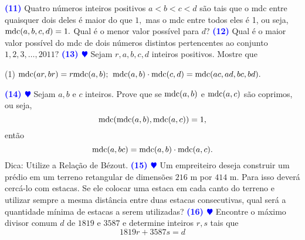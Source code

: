 \documentclass[12pt, a4paper]{article}
\newcommand{\mdc}{{\rm mdc}}
\newcommand{\negrito}[1]{\mbox{\boldmath{$#1$}}}
\begin{document}
\textcolor{blue}{\bf(11)} Quatro números inteiros positivos $a < b < c < d$ são tais que o mdc entre quaisquer
dois deles é maior do que $1,$ mas o mdc entre todos eles é 1, ou seja, $\mdc(a,b,c,d) = 1.$  Qual é o menor valor possível para $d$?
\newline\newline
\textcolor{blue}{\bf(12)} Qual é o maior valor possível do mdc de dois números distintos pertencentes ao conjunto
$1,2,3, \ldots ,2011?$
\newline \newline
\textcolor{blue}{\bf(13) $\varheart$} Sejam $r, a, b, c, d$ inteiros positivos. Mostre que
\begin{tasks}[counter-format={(tsk[a])},label-width=3.6ex, label-format = {\bfseries}, column-sep = {0pt}](1)
\task[\textcolor{Floresta}{$\negrito{(a)} $}] $\mdc(ar, br) = r \mdc(a,b);$
\task[\textcolor{Floresta}{$\negrito{(b)} $}] $\mdc(a,b) \cdot \mdc(c,d) = \mdc(ac, ad, bc, bd).$
\end{tasks}

\textcolor{blue}{\bf(14) $\varheart$} Sejam $a, b$ e $c$ inteiros. Prove que se $\mdc(a, b)$ e $\mdc(a, c)$ são coprimos, ou seja,
\[
\mdc(\mdc(a,b), \mdc(a,c)) = 1,
\] então
\[\mdc(a, bc) = \mdc(a, b) \cdot \mdc(a, c).\]
\textsf{Dica:} Utilize a Relação de Bézout.
\newline\newline
\textcolor{blue}{\bf(15) $\varheart$} Um empreiteiro deseja construir um prédio em um terreno retangular de dimensões $216$ m por $414$ m. Para isso deverá cercá-lo com estacas. Se ele colocar uma estaca em cada canto do terreno e utilizar sempre a mesma distância entre duas estacas consecutivas, qual será a quantidade mínima de estacas a serem utilizadas?
\newline\newline
\textcolor{blue}{\bf(16) $\varheart$} Encontre o máximo divisor comum $d$ de $1819$ e $3587$ e determine inteiros $r,s$ tais que
\[1819r + 3587s = d\]
\end{document}
